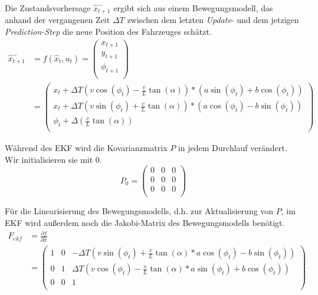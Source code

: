 \documentclass[11pt]{article}
\begin{document}
Die Zustandsvorhersage $\hat{x}_{t+1}^-$ ergibt sich aus einem Bewegungsmodell, das anhand der vergangenen Zeit $\Delta T$ zwischen dem letzten \textit{Update}- und dem jetzigen \textit{Prediction-Step} die neue Position des Fahrzeuges schätzt. 
\begin{equation}\label{EKF-Motion-Model}
\begin{split}
	\hat{x}_{t+1}^- &= f(\hat{x}_{t},u_t) = \begin{pmatrix}
		x_{t+1} \\
		y_{t+1} \\
		\phi_{t+1} \\
	  \end{pmatrix} \\
	  &= \begin{pmatrix}
		  x_{t}+\Delta T(v\cos(\phi_t)-\frac{v}{L}\tan(\alpha))*(a\sin(\phi_t)+b\cos(\phi_t)) \\
		  x_{t}+\Delta T(v\sin(\phi_t)+\frac{v}{L}\tan(\alpha))*(a\cos(\phi_t)-b\sin(\phi_t)) \\
		  \phi_t + \Delta(\frac{v}{L}\tan(\alpha)) \\
	  \end{pmatrix}
\end{split}
\end{equation}

Während des EKF wird die Kovarianzmatrix $P$ in jedem Durchlauf verändert. Wir initialisieren sie mit $0$. 
\begin{equation}\label{EKF-Initiale-Kovarianzmatrix}
	P_{0} = \begin{pmatrix}
		0 & 0 & 0 \\
		0 & 0 & 0 \\
		0 & 0 & 0 \\
	  \end{pmatrix}
\end{equation}

Für die Linearisierung des Bewegungsmodells, d.h. zur Aktualisierung von $P$, im EKF wird außerdem noch die Jakobi-Matrix des Bewegungsmodells benötigt.
\begin{equation}\label{EKF-Motion-Model-Jakobi-Matrix}
\begin{split}
	F_{ekf} &= \frac{\partial f}{\partial \hat{x}} \\
	&= \begin{pmatrix}
		1 & 0 & -\Delta T(v\sin(\phi_t)+\frac{v}{L}\tan(\alpha)*a\cos(\phi_t)-b\sin(\phi_t)) \\
		0 & 1 & \Delta T(v\cos(\phi_t)-\frac{v}{L}\tan(\alpha)*a\sin(\phi_t)+b\cos(\phi_t)) \\
		0 & 0 & 1 \\
	  \end{pmatrix}
\end{split}
\end{equation}
\end{document}
